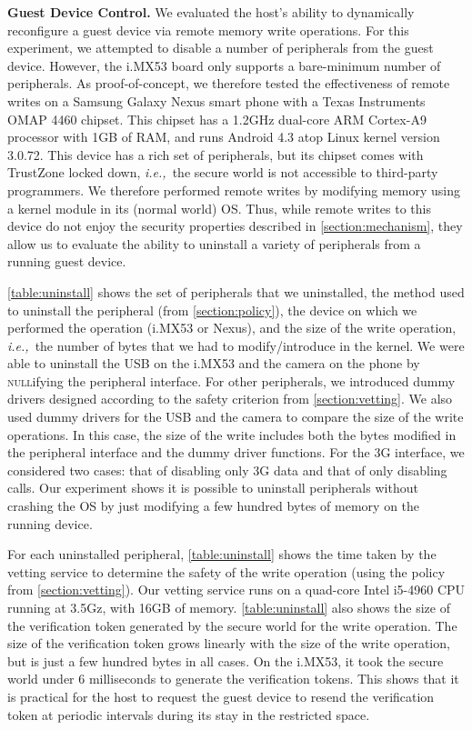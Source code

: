 \documentclass[pageno]{sig-alternate-05-2015}
\newcommand{\figref}[1]{\autoref{#1}}
\newcommand{\sectref}[1]{\autoref{#1}}
\newcommand{\myparagraph}[1]{\indent\par\noindent\textsf{\textbf{#1.}}}
\newcommand{\ie}{\textit{i.e.,}}
\newcommand{\addtext}[2]{#2}
\begin{document}
\myparagraph{Guest Device Control}
%
We evaluated the host's ability to dynamically reconfigure a guest device via
remote memory write operations. For this experiment, we attempted to disable a
number of peripherals from the guest device. However, the i.MX53 board only
supports a bare-minimum number of peripherals. As proof-of-concept, we
therefore tested the effectiveness of remote writes on a Samsung Galaxy Nexus
smart phone with a Texas Instruments OMAP 4460 chipset. This chipset has a
1.2GHz dual-core ARM Cortex-A9 processor with 1GB of RAM, and runs Android 4.3
atop Linux kernel version 3.0.72. This device has a rich set of peripherals,
but its chipset comes with TrustZone locked down, \ie~the secure world is not
accessible to third-party programmers.  We therefore performed remote writes by
modifying memory using a kernel module in its (normal world) OS.  Thus, while
remote writes to this device do not enjoy the security properties described in
\sectref{section:mechanism}, they allow us to evaluate the ability to uninstall
a variety of peripherals from a running guest device.

\figref{table:uninstall} shows the set of peripherals that we uninstalled, the
method used to uninstall the peripheral (from \sectref{section:policy}), the
device on which we performed the operation (i.MX53 or Nexus), and the size of
the write operation, \ie~the number of bytes that we had to modify/introduce in
the kernel.  We were able to uninstall the USB on the i.MX53 and the camera on
the phone by \textsc{null}ifying the peripheral interface. For other
peripherals, we introduced dummy drivers designed according to the safety
criterion from \sectref{section:vetting}. We also used dummy drivers for the
USB and the camera to compare the size of the write operations. In this case,
the size of the write includes both the bytes modified in the peripheral
interface and the dummy driver functions. For the 3G interface, we considered
two cases: that of disabling only 3G data and that of only disabling calls. Our
experiment shows it is possible to uninstall peripherals without crashing the
OS by just modifying a few hundred bytes of memory on the running device. 

\addtext{Tasks 1\&3}{For each uninstalled peripheral, \figref{table:uninstall}
shows the time taken by the vetting service to determine the safety of the
write operation (using the policy from \sectref{section:vetting}). Our vetting
service runs on a quad-core Intel i5-4960 CPU running at 3.5Gz, with 16GB of
memory.  \figref{table:uninstall} also shows the size of the verification token
generated by the secure world for the write operation. The size of the
verification token grows linearly with the size of the write operation, but is
just a few hundred bytes in all cases. On the i.MX53, it took the secure world
under 6 milliseconds to generate the verification tokens. This shows that it is
practical for the host to request the guest device to resend the verification
token at periodic intervals during its stay in the restricted space.}
\end{document}
